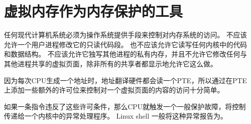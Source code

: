 
\section{虚拟内存作为内存保护的工具}
{
    任何现代计算机系统必须为操作系统提供手段来控制对内存系统的访问。
    不应该允许一个用户进程修改它的只读代码段。
    也不应该允许它读写任何内核中的代码和数据结构。
    不应该允许它独写其他进程的私有内存，并且不允许它修改任何与其他进程共享的虚拟页面，除非所有的共享者都显示地允许它这么做。

    因为每次CPU生成一个地址时，地址翻译硬件都会读一个PTE，所以通过在PTE上添加一些额外的许可位来控制对一个虚拟页面的内容的访问十分简单。

    如果一条指令违反了这些许可条件，那么CPU就触发一个一般保护故障，将控制传递给一个内核中的异常处理程序。
    Linux shell 一般将这种异常报告为。
}

